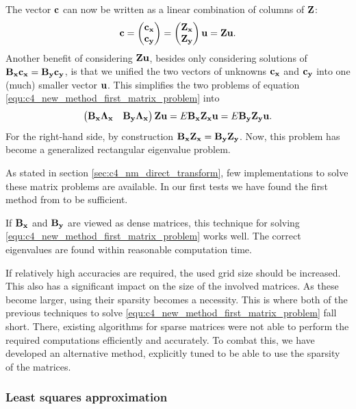 The vector $\vb{c}$ can now be written as a linear combination of columns of $\vb{Z}$:
$$
    \vb{c} = \begin{pmatrix}\vb{c_x} \\ \vb{c_y} \end{pmatrix} = \begin{pmatrix} \vb{Z_x} \\ \vb{Z_y} \end{pmatrix}  \vb{u} = \vb{Z} \vb{u} \text{.}
$$
Another benefit of considering $\vb{Z}\vb{u}$, besides only considering solutions of $\vb{B_x} \vb{c_x} = \vb{B_y} \vb{c_y}$, is that we unified the two vectors of unknowns $\vb{c_x}$ and $\vb{c_y}$ into one (much) smaller vector $\vb{u}$. This simplifies the two problems of equation \eqref{equ:c4_new_method_first_matrix_problem} into
$$
    \begin{pmatrix}
        \vb{B_x}\vb{\Lambda_x} & \vb{B_y}\vb{\Lambda_x}
    \end{pmatrix} \vb{Z} \vb{u} = E \vb{B_x} \vb{Z_x} \vb{u} = E \vb{B_y} \vb{Z_y} \vb{u} \text{.}
$$
For the right-hand side, by construction $\vb{B_x} \vb{Z_x} = \vb{B_y} \vb{Z_y}$. Now, this problem has become a generalized rectangular eigenvalue problem.

As stated in section \ref{sec:c4_nm_direct_transform}, few implementations to solve these matrix problems are available. In our first tests we have found the first method from \cite{hua_svd_1991} to be sufficient.

If $\vb{B_x}$ and $\vb{B_y}$ are viewed as dense matrices, this technique for solving \eqref{equ:c4_new_method_first_matrix_problem} works well. The correct eigenvalues are found within reasonable computation time.

If relatively high accuracies are required, the used grid size should be increased. This also has a significant impact on the size of the involved matrices. As these become larger, using their sparsity becomes a necessity. This is where both of the previous techniques to solve \eqref{equ:c4_new_method_first_matrix_problem} fall short. There, existing algorithms for sparse matrices were not able to perform the required computations efficiently and accurately. To combat this, we have developed an alternative method, explicitly tuned to be able to use the sparsity of the matrices.

\subsubsection{Least squares approximation}\label{sec:c4_matrix_least_squares}

